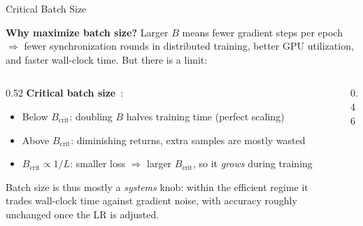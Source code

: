 \begin{frame}{Critical Batch Size}

  \textbf{Why maximize batch size?} Larger $B$ means fewer gradient steps per epoch $\Rightarrow$ fewer synchronization rounds in distributed training, better GPU utilization, and faster wall-clock time. But there is a limit:

  \medskip
  \begin{columns}[T]
    \begin{column}{0.52\textwidth}
      \textbf{Critical batch size}~\cite{mccandlish2018empirical}:
      \begin{itemize}
        \item Below $B_{\text{crit}}$: doubling $B$ halves training time (perfect scaling)
        \item Above $B_{\text{crit}}$: diminishing returns, extra samples are mostly wasted
        \item $B_{\text{crit}} \propto 1/L$: smaller loss $\Rightarrow$ larger $B_{\text{crit}}$, so it \emph{grows} during training
      \end{itemize}

      \medskip
      Batch size is thus mostly a \emph{systems} knob: within the efficient regime it trades wall-clock time against gradient noise, with accuracy roughly unchanged once the LR is adjusted.
    \end{column}
    \begin{column}{0.46\textwidth}
      \centering
    \end{column}
  \end{columns}


\end{frame}
